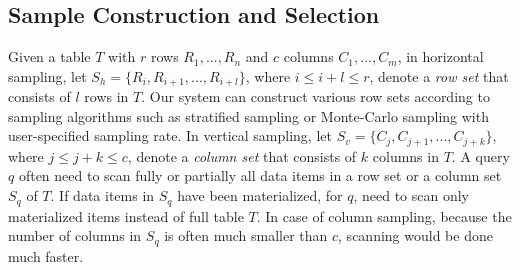 \documentclass{sig-alternate-05-2015}
\begin{document}
\subsection{Sample Construction and Selection}
Given a table $T$ with $r$ rows $R_1, ..., R_n$ and $c$ columns $C_1, ..., C_m$, 
in horizontal sampling, let $S_h=\{R_i, R_{i+1}, ..., R_{i+l}\}$, where $ i \leq i+l \leq r$, denote a \textit{row set}  that consists of $l$ rows in $T$. Our system can construct various row sets according to  sampling algorithms such as stratified sampling \cite{Chaudhuri:2007} or Monte-Carlo sampling with user-specified sampling rate.
In vertical sampling, let $S_v=\{C_j, C_{j+1}, ..., C_{j+k}\}$, where $ j \leq j+k \leq c$, denote a \textit{column set} that consists of $k$ columns in $T$. 
A query $q$ often need to scan fully or partially all data items in a row set or a column set $S_q$ of $T$. 
If data items in $S_q$ have been materialized, for $q$, need to scan only materialized items instead of full table $T$. 
In case of column sampling, because the number of columns in $S_q$ is often much smaller than $c$, scanning would be done much faster.
%
%
\end{document}
